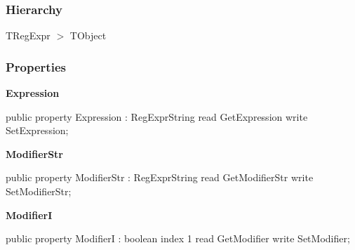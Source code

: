 \documentclass{report}
\newif\ifpdf
\begin{document}
\subsubsection*{\large{\textbf{Hierarchy}}\normalsize\hspace{1ex}\hfill}
TRegExpr {$>$} TObject
\subsubsection*{\large{\textbf{Properties}}\normalsize\hspace{1ex}\hfill}
\begin{list}{}{
\setlength{\itemindent}{0cm}
\setlength{\listparindent}{0cm}
\setlength{\leftmargin}{\evensidemargin}
\addtolength{\leftmargin}{\tmplength}
\settowidth{\labelsep}{X}
\addtolength{\leftmargin}{\labelsep}
\setlength{\labelwidth}{\tmplength}
}
\label{RegExpr.TRegExpr-Expression}
\item[\textbf{Expression}\hfill]
\ifpdf
\begin{flushleft}
\fi
\begin{ttfamily}
public property Expression : RegExprString read GetExpression write SetExpression;\end{ttfamily}

\ifpdf
\end{flushleft}
\fi


\par  \label{RegExpr.TRegExpr-ModifierStr}
\item[\textbf{ModifierStr}\hfill]
\ifpdf
\begin{flushleft}
\fi
\begin{ttfamily}
public property ModifierStr : RegExprString read GetModifierStr write SetModifierStr;\end{ttfamily}

\ifpdf
\end{flushleft}
\fi


\par  \label{RegExpr.TRegExpr-ModifierI}
\item[\textbf{ModifierI}\hfill]
\ifpdf
\begin{flushleft}
\fi
\begin{ttfamily}
public property ModifierI : boolean index 1 read GetModifier write SetModifier;\end{ttfamily}

\ifpdf
\end{flushleft}
\fi



\end{list}
\end{document}
